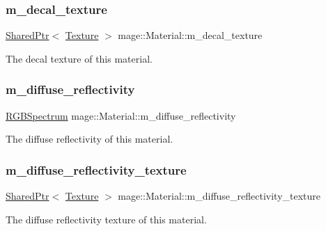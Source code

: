 \subsubsection{\texorpdfstring{m\+\_\+decal\+\_\+texture}{m\_decal\_texture}}
{\footnotesize\ttfamily \hyperlink{namespacemage_a1e01ae66713838a7a67d30e44c67703e}{Shared\+Ptr}$<$ \hyperlink{classmage_1_1_texture}{Texture} $>$ mage\+::\+Material\+::m\+\_\+decal\+\_\+texture}

The decal texture of this material. \hypertarget{structmage_1_1_material_afd2cc813023698e52edc01b267a17e6c}{}\label{structmage_1_1_material_afd2cc813023698e52edc01b267a17e6c} 
\subsubsection{\texorpdfstring{m\+\_\+diffuse\+\_\+reflectivity}{m\_diffuse\_reflectivity}}
{\footnotesize\ttfamily \hyperlink{structmage_1_1_r_g_b_spectrum}{R\+G\+B\+Spectrum} mage\+::\+Material\+::m\+\_\+diffuse\+\_\+reflectivity}

The diffuse reflectivity of this material. \hypertarget{structmage_1_1_material_a5193e30d3875695c96526a85edc84b88}{}\label{structmage_1_1_material_a5193e30d3875695c96526a85edc84b88} 
\subsubsection{\texorpdfstring{m\+\_\+diffuse\+\_\+reflectivity\+\_\+texture}{m\_diffuse\_reflectivity\_texture}}
{\footnotesize\ttfamily \hyperlink{namespacemage_a1e01ae66713838a7a67d30e44c67703e}{Shared\+Ptr}$<$ \hyperlink{classmage_1_1_texture}{Texture} $>$ mage\+::\+Material\+::m\+\_\+diffuse\+\_\+reflectivity\+\_\+texture}

The diffuse reflectivity texture of this material. \hypertarget{structmage_1_1_material_a04ca0a2efe12529ae0ea91e9cb622ade}{}\label{structmage_1_1_material_a04ca0a2efe12529ae0ea91e9cb622ade} 

